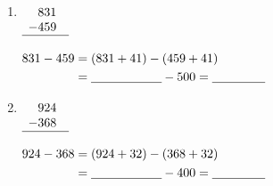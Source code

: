 \documentclass{article}
\begin{document}
\begin{enumerate}[label=\textbf{\arabic*.}, itemsep=2em, leftmargin=2em]
  \item 
  \begin{minipage}[t]{0.28\linewidth}
    $\begin{array}[t]{r@{\quad}l}
        831 \\
      - 459 \\
      \hline
    \end{array}$
  \end{minipage}%
  \begin{minipage}[t]{0.68\linewidth}
    $\begin{aligned}[t]
      831 - 459 &= (831 + 41) - (459 + 41) \\
                &= \underline{\hspace{2cm}} - 500 = \underline{\hspace{1.5cm}}
    \end{aligned}$
  \end{minipage}

  \item 
  \begin{minipage}[t]{0.28\linewidth}
    $\begin{array}[t]{r@{\quad}l}
        924 \\
      - 368 \\
      \hline
    \end{array}$
  \end{minipage}%
  \begin{minipage}[t]{0.68\linewidth}
    $\begin{aligned}[t]
      924 - 368 &= (924 + 32) - (368 + 32) \\
                &= \underline{\hspace{2cm}} - 400 = \underline{\hspace{1.5cm}}
    \end{aligned}$
  \end{minipage}

\end{enumerate}
% 
\end{document}
